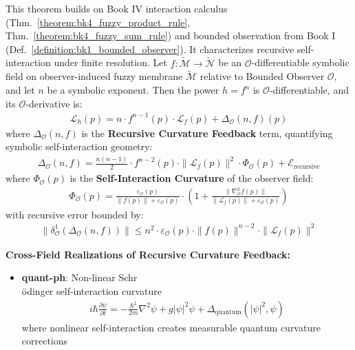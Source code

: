 \begin{theorem}
\label{theorem:bk4_fuzzy_power_rule}
This theorem builds on Book IV interaction calculus (Thm.~\ref{theorem:bk4_fuzzy_product_rule}, Thm.~\ref{theorem:bk4_fuzzy_sum_rule}) and bounded observation from Book I (Def.~\ref{definition:bk1_bounded_observer}). It characterizes recursive self-interaction under finite resolution.
Let $f: \tilde{\mathcal{M}} \rightarrow \tilde{\mathcal{N}}$ be an $\mathcal{O}$-differentiable symbolic field on observer-induced fuzzy membrane $\tilde{\mathcal{M}}$ relative to Bounded Observer $\mathcal{O}$, and let $n$ be a symbolic exponent. Then the power $h = f^n$ is $\mathcal{O}$-differentiable, and its $\mathcal{O}$-derivative is:
\begin{align}
\mathcal{L}_h(p) = n \cdot f^{n-1}(p) \cdot \mathcal{L}_f(p) + \Delta_{\mathcal{O}}(n, f)(p)
\end{align}
where $\Delta_{\mathcal{O}}(n, f)$ is the \textbf{Recursive Curvature
Feedback} term, quantifying symbolic self-interaction geometry:
\begin{align}
\Delta_{\mathcal{O}}(n, f) = \frac{n(n-1)}{2} \cdot f^{n-2}(p) \cdot \|\mathcal{L}_f(p)\|^2 \cdot \Phi_{\mathcal{O}}(p) + \mathcal{E}_{\text{recursive}}
\end{align}
where $\Phi_{\mathcal{O}}(p)$ is the \textbf{Self-Interaction Curvature} of
the observer field:
\begin{align}
\Phi_{\mathcal{O}}(p) = \frac{\varepsilon_{\mathcal{O}}(p)}{\|f(p)\| + \varepsilon_{\mathcal{O}}(p)} \cdot \left(1 + \frac{\|\nabla_{\mathcal{O}}^2 f(p)\|}{\|\mathcal{L}_f(p)\| + \varepsilon_{\mathcal{O}}(p)}\right)
\end{align}
with recursive error bounded by:
\begin{align}
\|\delta^1_{\mathcal{O}}(\Delta_{\mathcal{O}}(n, f))\| \leq n^2 \cdot \varepsilon_{\mathcal{O}}(p) \cdot \|f(p)\|^{n-2} \cdot \|\mathcal{L}_f(p)\|^2
\end{align}

\textbf{Cross-Field Realizations of Recursive Curvature Feedback:}

\begin{itemize}
\item \textbf{quant-ph}: Non-linear Schr\\\"odinger self-interaction curvature
  \begin{align}
  i\hbar \frac{\partial \psi}{\partial t} = -\frac{\hbar^2}{2m}\nabla^2 \psi + g|\psi|^2 \psi + \Delta_{\text{quantum}}(|\psi|^2, \psi)
  \end{align}
  where nonlinear self-interaction creates measurable quantum curvature corrections
  

\end{itemize}
\end{theorem}
